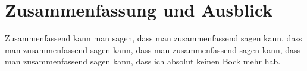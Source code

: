 \section{Zusammenfassung und Ausblick}\label{zusammenfassung-u-ausblick}
Zusammenfassend kann man sagen, dass man zusammenfassend sagen kann, dass man
zusammenfassend sagen kann, dass man zusammenfassend sagen kann, dass man
zusammenfassend sagen kann, dass ich absolut keinen Bock mehr hab.